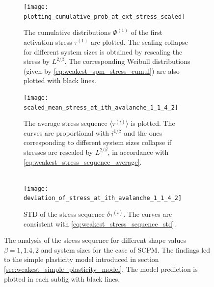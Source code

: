 \begin{figure}[htbp!] 
  \centering
  \begin{subfigure}[b]{0.48\textwidth}
    \texttt{[image: plotting\_cumulative\_prob\_at\_ext\_stress\_scaled]}
    \caption{The cumulative distributions $\Phi^{(1)}$ of the first activation stress $\tau^{(1)}$ are plotted. The scaling collapse for different system sizes is obtained by rescaling the stress by $L^{2/\beta}$. The corresponding Weibull distributions (given by \cref{eq:weakest_spm_stress_cumul}) are also plotted with black lines.}
    \label{fig:weakest_tau_i_scpma}   
  \end{subfigure}          \hspace{0.01\textwidth}
  \begin{subfigure}[b]{0.48\textwidth}
    \texttt{[image: scaled\_mean\_stress\_at\_ith\_avalanche\_1\_1\_4\_2]}
    \caption{The average stress sequence $\langle \tau^{(i)} \rangle$ is plotted. The curves are proportional with $i^{1/\beta}$ and the ones corresponding to different system sizes collapse if stresses are rescaled by $L^{2/\beta}$, in accordance with \cref{eq:weakest_stress_sequence_average}.\\ \\}
    \label{fig:weakest_tau_i_scpmb}   
  \end{subfigure}             
  \begin{subfigure}[b]{0.46\textwidth}
    \texttt{[image: deviation\_of\_stress\_at\_ith\_avalanche\_1\_1\_4\_2]}
    \caption{STD of the stress sequence $\delta \tau^{(i)}$. The curves are consistent with \cref{eq:weakest_stress_sequence_std}.}
    \label{fig:weakest_tau_i_scpmc}
  \end{subfigure}
  \caption[Stress sequences for the SCPM]{The analysis of the stress sequence for different shape values $\beta=1, 1.4, 2$ and system sizes for the case of SCPM. The findings led to the simple plasticity model introduced in section \ref{sec:weakest_simple_plasticity_model}. The model prediction is plotted in each subfig with black lines.}
  \label{fig:weakest_tau_i_scpm}
\end{figure}

